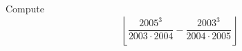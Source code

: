 Compute \[ \left\lfloor \dfrac {2005^3}{2003 \cdot 2004} - \dfrac {2003^3}{2004 \cdot 2005} \right\rfloor \]